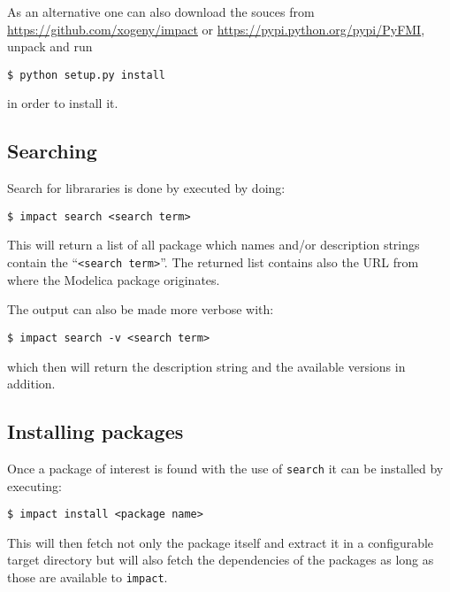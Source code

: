 \documentclass[11pt,a4paper,twocolumn]{article}
\newcommand{\impact}{\texttt{impact}} %
\newcommand{\code}[1]{\texttt{#1}} %
\begin{document}
As an alternative one can also download the souces from
\url{https://github.com/xogeny/impact} or
\url{https://pypi.python.org/pypi/PyFMI},
unpack and run
\begin{lstlisting}
$ python setup.py install
\end{lstlisting}

in order to install it.




\subsection{Searching} %
\label{cmd:search}

Search for librararies is done by executed by doing:

\begin{lstlisting}
$ impact search <search term>
\end{lstlisting}

This will return a list of all package which names and/or description strings
contain the ``\code{<search term>}''. The returned list contains also the URL
from where the Modelica package originates.

The output can also be made more verbose with:
\begin{lstlisting}
$ impact search -v <search term>
\end{lstlisting}
which then will return the description string and the available versions
in addition.

\subsection{Installing packages} %
\label{cmd:install-pkg}
Once a package of interest is found with the use of \code{search} it can
be installed by executing:
\begin{lstlisting}
$ impact install <package name>
\end{lstlisting}
This will then fetch not only the package itself and extract it in a
configurable target directory but will also fetch the dependencies of
the packages as long as those are available to \impact.
\end{document}
